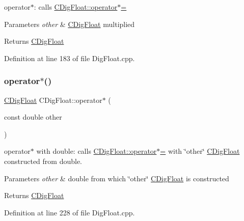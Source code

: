 operator$\ast$\+: calls \hyperlink{classCDigFloat_a9535d47a31a3f1cfa487cc8c567a4a12}{C\+Dig\+Float\+::operator$\ast$=} 


\begin{DoxyParams}{Parameters}
{\em other} & \hyperlink{classCDigFloat}{C\+Dig\+Float} multiplied \\
\hline
\end{DoxyParams}
\begin{DoxyReturn}{Returns}
\hyperlink{classCDigFloat}{C\+Dig\+Float} 
\end{DoxyReturn}


Definition at line 183 of file Dig\+Float.\+cpp.

\mbox{\label{classCDigFloat_aa699c4362ad8acfcd1649f93d805e105}} 
\subsubsection{\texorpdfstring{operator$\ast$()}{operator*()}\hspace{0.1cm}{\footnotesize\ttfamily [2/2]}}
{\footnotesize\ttfamily \hyperlink{classCDigFloat}{C\+Dig\+Float} C\+Dig\+Float\+::operator$\ast$ (\begin{DoxyParamCaption}\item[{const double}]{other }\end{DoxyParamCaption})}



operator$\ast$ with double\+: calls \hyperlink{classCDigFloat_a9535d47a31a3f1cfa487cc8c567a4a12}{C\+Dig\+Float\+::operator$\ast$=} with \char`\"{}other\char`\"{} \hyperlink{classCDigFloat}{C\+Dig\+Float} constructed from double. 


\begin{DoxyParams}{Parameters}
{\em other} & double from which \char`\"{}other\char`\"{} \hyperlink{classCDigFloat}{C\+Dig\+Float} is constructed \\
\hline
\end{DoxyParams}
\begin{DoxyReturn}{Returns}
\hyperlink{classCDigFloat}{C\+Dig\+Float} 
\end{DoxyReturn}


Definition at line 228 of file Dig\+Float.\+cpp.

\mbox{\label{classCDigFloat_a9535d47a31a3f1cfa487cc8c567a4a12}} 
